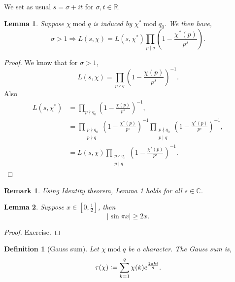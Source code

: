 \documentclass{article}
\newtheorem{definition}{Definition}[section]
\newtheorem{lemma}{Lemma}[section]
\newtheorem{remark}{Remark}[section]
\DeclareMathOperator{\tmod}{mod}
\newcommand{\defeq}{\vcentcolon=}
\newcommand{\R}[0]{\mathbb{R}}
\newcommand{\C}[0]{\mathbb{C}}
\begin{document}
We set as usual $s=\sigma+it$ for $\sigma,t\in\R$. 

\begin{lemma}
  Suppose $\chi\tmod q$ is induced by $\chi^*\tmod q_0$. We then have,
  \begin{equation*}
    \sigma>1\Rightarrow L(s,\chi) = L(s,\chi^*)\prod_{p\mid q}\left(1-{\frac {\chi^*(p)} {p^s}}\right).
  \end{equation*}
  \label{lemma_induced_character_L}
\end{lemma}

\begin{proof}We know that for $\sigma>1$,
  \begin{equation*}
    L(s,\chi) = \prod_{p\nmid q}\left(1-{\frac {\chi(p)} {p^s}}\right)^{-1}.
  \end{equation*}
  Also 
  \begin{align*}
    L(s,\chi^*) &= \prod_{p\nmid q_0}\left(1-{\frac {\chi(p)} {p^s}}\right)^{-1},\\
    & = \prod_{\substack{p\nmid q_0\\p\nmid q}}\left(1-{\frac {\chi^*(p)} {p^s}}\right)^{-1}\prod_{\substack{p\nmid q_0\\p\mid q}}\left(1-{\frac {\chi^*(p)} {p^s}}\right)^{-1},\\
    & = L(s,\chi)\prod_{\substack{p\nmid q_0\\p\mid q}}\left(1-{\frac {\chi^*(p)} {p^s}}\right)^{-1}.
  \end{align*}
\end{proof}

\begin{remark}
  Using Identity theorem, Lemma \ref{lemma_induced_character_L} holds for all $s\in \C$.
\end{remark}

\begin{lemma}
  Suppose $x\in\left[0,{\frac 1 2}\right]$, then 
  \begin{equation*}
    \vert\sin\pi x\vert\geq 2x.
  \end{equation*}
  \label{lemma_sin_lower_bound}
\end{lemma}

\begin{proof}
  Exercise.
\end{proof}

\begin{definition}[Gauss sum]
  Let $\chi\tmod q$ be a character. The Gauss sum is,
  \begin{equation*}
    \tau(\chi)\defeq\sum_{k=1}^q\chi(k)e^{{\frac {2\pi ki} q}}.
  \end{equation*}
\end{definition}
\end{document}
